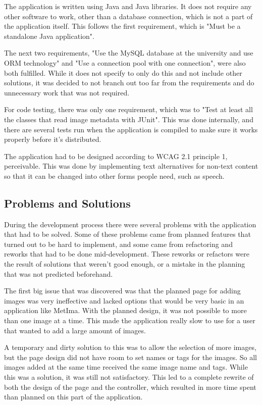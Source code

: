             The application is written using Java and Java libraries. It does not require any other software to work, other than a database connection, which is not a part of the application itself. This follows the first requirement, which is "Must be a standalone Java application".
            
            The next two requirements, "Use the MySQL database at the university and use ORM technology" and "Use a connection pool with one connection", were also both fulfilled. While it does not specify to only do this and not include other solutions, it was decided to not branch out too far from the requirements and do unnecessary work that was not required.
            
            For code testing, there was only one requirement, which was to "Test at least all the classes that read image metadata with JUnit". This was done internally, and there are several tests run when the application is compiled to make sure it works properly before it's distributed. 
            
            The application had to be designed according to WCAG 2.1 principle 1, perceivable. This was done by implementing text alternatives for non-text content so that it can be changed into other forms people need, such as speech.

        \subsection{Problems and Solutions}
            During the development process there were several problems with the application that had to be solved. Some of these problems came from planned features that turned out to be hard to implement, and some came from refactoring and reworks that had to be done mid-development. These reworks or refactors were the result of solutions that weren't good enough, or a mistake in the planning that was not predicted beforehand.  
            
            The first big issue that was discovered was that the planned page for adding images was very ineffective and lacked options that would be very basic in an application like MetIma. With the planned design, it was not possible to more than one image at a time. This made the application really slow to use for a user that wanted to add a large amount of images. 
            
            A temporary and dirty solution to this was to allow the selection of more images, but the page design did not have room to set names or tags for the images. So all images added at the same time received the same image name and tags. While this was a solution, it was still not satisfactory. This led to a complete rewrite of both the design of the page and the controller, which resulted in more time spent than planned on this part of the application.
            
